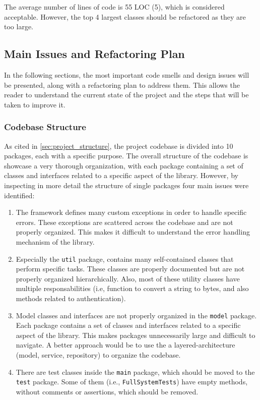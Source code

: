 \noindent The average number of lines of code is 55 LOC (5), which is considered acceptable. However, the top 4 largest classes should be refactored as they are too large.

\subsection{Main Issues and Refactoring Plan}

In the following sections, the most important code smells and design issues will be presented, along with a refactoring plan to address them. This allows the reader to understand the current state of the project and the steps that will be taken to improve it.

\subsubsection{Codebase Structure}

As cited in \autoref{sec:project_structure}, the project codebase is divided into 10 packages, each with a specific purpose. The overall structure of the codebase is showcase a very thorough organization, with each package containing a set of classes and interfaces related to a specific aspect of the library. However, by inspecting in more detail the structure of single packages four main issues were identified:

\begin{enumerate}
	\item The framework defines many custom exceptions in order to handle specific errors. These exceptions are scattered across the codebase and are not properly organized. This makes it difficult to understand the error handling mechanism of the library.
	\item Especially the \texttt{util} package, contains many self-contained classes that perform specific tasks. These classes are properly documented but are not properly organized hierarchically. Also, most of these utility classes have multiple responsabilities (i.e, function to convert a string to bytes, and also methods related to authentication).
	\item Model classes and interfaces are not properly organized in the \texttt{model} package. Each package contains a set of classes and interfaces related to a specific aspect of the library. This makes packages unnecessarily large and difficult to navigate. A better approach would be to use the a layered-architecture (model, service, repository) to organize the codebase.
	\item There are test classes inside the \texttt{main} package, which should be moved to the \texttt{test} package. Some of them (i.e., \texttt{FullSystemTests}) have empty methods, without comments or assertions, which should be removed.
\end{enumerate}


